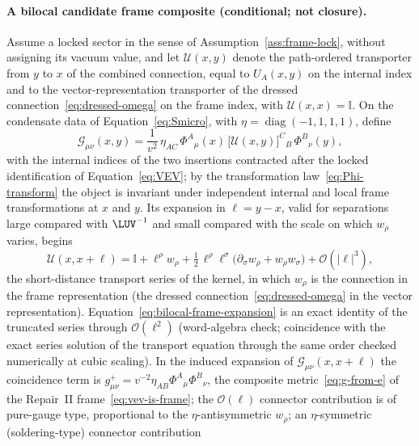 \paragraph{A bilocal candidate frame composite (conditional; not closure).}
Assume a locked sector in the sense of Assumption~\ref{ass:frame-lock}, without assigning its
vacuum value, and let $\mathcal U(x,y)$ denote the path-ordered transporter from $y$ to $x$ of
the combined connection, equal to $U_A(x,y)$ on the internal index and to the vector-representation
transporter of the dressed connection~\eqref{eq:dressed-omega} on the frame index, with
$\mathcal U(x,x)=\mathbb I$. On the condensate data of Equation~\eqref{eq:Smicro}, with
$\eta=\operatorname{diag}(-1,1,1,1)$, define
\begin{equation}
  \label{eq:bilocal-frame-op}
  \mathcal G_{\mu\nu}(x,y)
  =
  \frac{1}{v^{2}}\,\eta_{AC}\,\Phi^{A}{}_{\mu}(x)\,
  \bigl[\mathcal U(x,y)\bigr]^{C}{}_{B}\,\Phi^{B}{}_{\nu}(y),
\end{equation}
with the internal indices of the two insertions contracted after the locked identification of
Equation~\eqref{eq:VEV}; by the transformation law~\eqref{eq:Phi-transform} the object is
invariant under independent internal and local frame transformations at $x$ and $y$. Its
expansion in $\ell=y-x$, valid for separations large compared with $\LUV^{-1}$ and small compared with the scale on which $w_{\rho}$ varies, begins
\begin{equation}
  \label{eq:bilocal-frame-expansion}
  \mathcal U(x,x+\ell)
  =
  \mathbb I+\ell^{\rho}w_{\rho}
  +\tfrac{1}{2}\,\ell^{\rho}\ell^{\sigma}
   \bigl(\partial_{\sigma}w_{\rho}+w_{\rho}w_{\sigma}\bigr)
  +\mathcal O(|\ell|^{3}),
\end{equation}
the short-distance transport series of the kernel, in which $w_{\rho}$ is the connection in the
frame representation (the dressed connection~\eqref{eq:dressed-omega} in the vector
representation). Equation~\eqref{eq:bilocal-frame-expansion} is an exact identity of the
truncated series through $\mathcal O(\ell^{2})$ (word-algebra check; coincidence with the exact
series solution of the transport equation through the same order checked numerically at cubic
scaling). In the induced expansion of $\mathcal G_{\mu\nu}(x,x+\ell)$ the coincidence term is
$g^{+}_{\mu\nu}=v^{-2}\eta_{AB}\Phi^{A}{}_{\mu}\Phi^{B}{}_{\nu}$, the composite
metric~\eqref{eq:g-from-e} of the Repair~II frame~\eqref{eq:vev-is-frame}; the
$\mathcal O(\ell)$ connector contribution is of pure-gauge type, proportional to the
$\eta$-antisymmetric $w_{\rho}$; an $\eta$-symmetric (soldering-type) connector contribution
